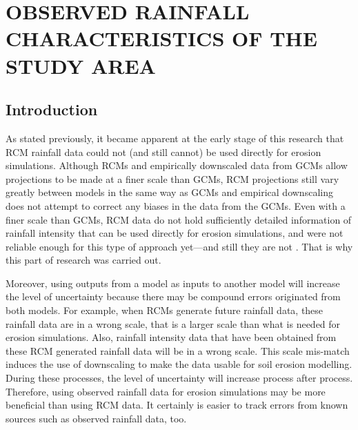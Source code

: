 \chapter{OBSERVED RAINFALL CHARACTERISTICS OF THE STUDY AREA}
\label{sec:RainfallCharacteristicsOfTheStudyArea}


\section{Introduction}
\label{sec:ObservedRainfallIntroduction}
As stated previously, it became apparent at the early stage of this research
that RCM rainfall data could not (and still cannot) be used directly for erosion
simulations. Although RCMs and empirically downscaled data from GCMs allow
projections to be made at a finer scale than GCMs, RCM projections still vary
greatly between models in the same way as GCMs and empirical downscaling does
not attempt to correct any biases in the data from the GCMs. Even with a finer
scale than GCMs, RCM data do not hold sufficiently detailed information of
rainfall intensity that can be used directly for erosion simulations, and were
not reliable enough for this type of approach yet---and still they are not
\citep{nearing2001-229,michael2005-155,o'neal2005-165}. That is why this part of
research was carried out.

Moreover, using outputs from a model as inputs to another model will increase
the level of uncertainty because there may be compound errors originated from
both models. For example, when RCMs generate future rainfall data, these
rainfall data are in a wrong scale, that is a larger scale than what is needed
for erosion simulations. Also, rainfall intensity data that have been obtained
from these RCM generated rainfall data will be in a wrong scale. This scale
mis-match induces the use of downscaling to make the data usable for soil
erosion modelling. During these processes, the level of uncertainty will
increase process after process. Therefore, using observed rainfall data for
erosion simulations may be more beneficial than using RCM data. It certainly is
easier to track errors from known sources such as observed rainfall data, too.

